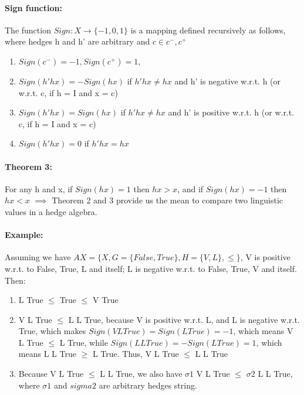 \documentclass[part1.tex]{subfiles}
\begin{document}
\paragraph {Sign function:} The function $Sign: X \rightarrow
\{-1,0,1\}$ is a mapping defined recursively as follows, where
hedges h and h' are arbitrary and $c \in c^{-}, c^{+}$
\begin{enumerate}
        \item $Sign(c^{-}) = -1, Sign(c^{+}) = 1$,
        \item $Sign(h'hx) = -Sign(hx)$ if $h'hx \neq hx$ and h'
                is negative w.r.t. h (or w.r.t. c, if h = I and x
                = c)
        \item $Sign(h'hx) = Sign(hx)$ if $h'hx \neq hx$ and h'
                is positive w.r.t. h (or w.r.t. c, if h = I and x
                = c)
        \item $Sign(h'hx) = 0$ if $h'hx = hx$
\end{enumerate}
\paragraph{Theorem 3:} For any h and x, if $Sign(hx) = 1$ then
$hx > x$, and if $Sign(hx) = -1$ then $hx < x$
\indent \(\implies\) Theorem 2 and 3 provide us the mean to
compare two linguistic values in a hedge 
algebra.
\paragraph{Example:} Assuming we have $AX = \{X, G =
\{False, True\}, H=\{V,L\}, \le\}$, V is positive w.r.t. to
False, True, L and itself; L is negative w.r.t. to
False, True, V and itself. Then:
\begin{enumerate}
        \item L True $\le$ True $\le$ V True
        \item V L True $\le$ L L True, because V is positive
                w.r.t. L, and L is negative w.r.t. True, which
                makes $Sign(V L True) = Sign(L True) = -1$, which
                means V L True $\le$ L True, while $Sign(L L
                True) = -Sign(L True) = 1$, which means L L True
                $\ge$ L True. Thus, V L True $\le$ L L True
        \item Because V L True $\le$ L L True, we also have $\sigma1$ 
                V L True $\le$ $\sigma2$ L L True, where
                $\sigma1$ and $sigma2$ are arbitrary hedges
                string. 
\end{enumerate}
\end{document}
